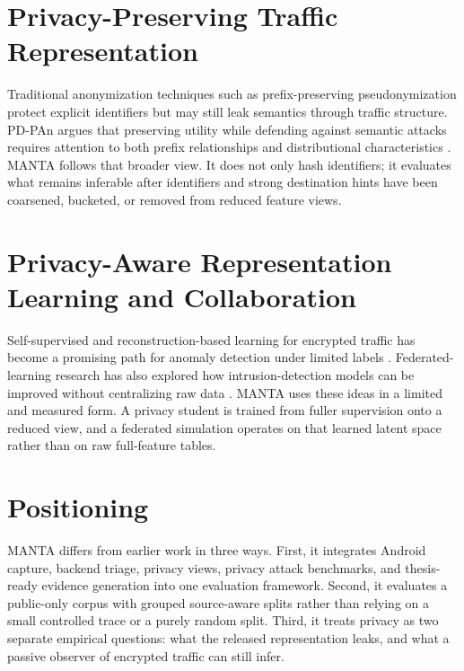 \section{Privacy-Preserving Traffic Representation}
Traditional anonymization techniques such as prefix-preserving pseudonymization protect explicit
identifiers but may still leak semantics through traffic structure. PD-PAn argues that preserving
utility while defending against semantic attacks requires attention to both prefix relationships and
distributional characteristics \citep{pd_pan_2023}. MANTA follows that broader view. It does not
only hash identifiers; it evaluates what remains inferable after identifiers and strong destination
hints have been coarsened, bucketed, or removed from reduced feature views.

\section{Privacy-Aware Representation Learning and Collaboration}
Self-supervised and reconstruction-based learning for encrypted traffic has become a promising path
for anomaly detection under limited labels \citep{et_ssl_2025}. Federated-learning research has also
explored how intrusion-detection models can be improved without centralizing raw data
\citep{federated_privacy_ids_2023,privacy_fl_ids_2024}. MANTA uses these ideas in a limited and
measured form. A privacy student is trained from fuller supervision onto a reduced view, and a
federated simulation operates on that learned latent space rather than on raw full-feature tables.

\section{Positioning}
MANTA differs from earlier work in three ways. First, it integrates Android capture, backend triage,
privacy views, privacy attack benchmarks, and thesis-ready evidence generation into one evaluation
framework. Second, it evaluates a public-only corpus with grouped source-aware splits rather than
relying on a small controlled trace or a purely random split. Third, it treats privacy as two
separate empirical questions: what the released representation leaks, and what a passive observer of
encrypted traffic can still infer.
